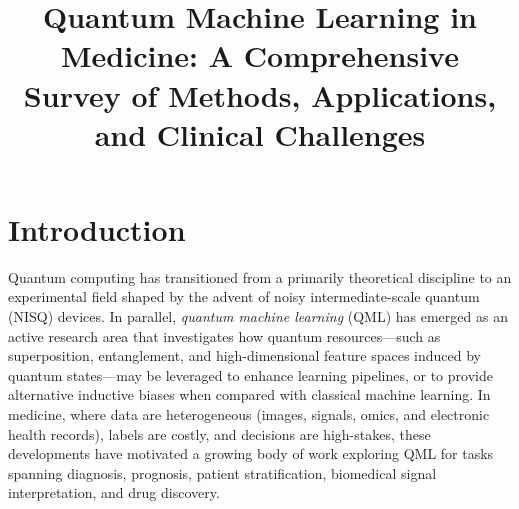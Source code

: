 \documentclass[pdflatex,bst/sn-mathphys-num]{sn-jnl}
\begin{document}
\title[QML in Medicine]{Quantum Machine Learning in Medicine: A Comprehensive Survey of Methods, Applications, and Clinical Challenges}

\author*[1]{ }
\author[1]{ }
\author[2]{ }
\author[2]{ }
\author[2]{ }
\author[2,3]{ }
\author[2]{ }
\author[1]{ }
\author*[1,2]{ }



\abstract{
}
\keywords{}

\maketitle

\section{Introduction}\label{sec:introduction}

Quantum computing has transitioned from a primarily theoretical discipline to an experimental field shaped by the advent of noisy intermediate-scale quantum (NISQ) devices. In parallel, \emph{quantum machine learning} (QML) has emerged as an active research area that investigates how quantum resources---such as superposition, entanglement, and high-dimensional feature spaces induced by quantum states---may be leveraged to enhance learning pipelines, or to provide alternative inductive biases when compared with classical machine learning. In medicine, where data are heterogeneous (images, signals, omics, and electronic health records), labels are costly, and decisions are high-stakes, these developments have motivated a growing body of work exploring QML for tasks spanning diagnosis, prognosis, patient stratification, biomedical signal interpretation, and drug discovery.
\end{document}
